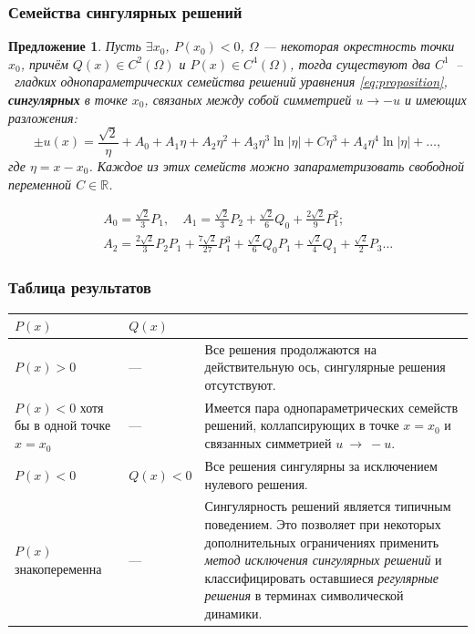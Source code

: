 \documentclass [10pt] {beamer}
\newtheorem{proposition}{Предложение}
\begin{document}
\begin{frame}
	\frametitle{Семейства сингулярных решений}

	\begin{proposition}
		Пусть $\exists x_0$, $P(x_0) < 0$, $\Omega$ --- некоторая окрестность точки $x_0$, причём $Q(x) \in C^2(\Omega)$ и $P(x) \in C^4(\Omega)$, тогда существуют два $C^1$~--~гладких однопараметрических семейства решений уравнения \eqref{eq:proposition}, {\bf сингулярных} в точке $x_0$, связаных между собой симметрией $u \to -u$ и имеющих разложения:
		\begin{equation}
			\pm u(x) = \frac{\sqrt{2}} \eta + A_0 + A_1 \eta + A_2 \eta^2 + A_3 \eta^3 \ln|\eta| + C \eta^3 + A_4 	\eta^4 \ln|\eta| + \ldots,
			\label{eq:series}
		\end{equation}
 		где $\eta = x - x_0$.
		Каждое из этих семейств можно запараметризовать свободной переменной $C \in \mathbb{R}$.
	\end{proposition}

	\begin{small}
		\begin{eqnarray*}	
			&& A_0 = \frac{\sqrt{2}}3P_1, \quad A_1 = \frac{\sqrt{2}} 3P_2 + \frac{\sqrt{2}} 6Q_0 + \frac{2\sqrt{2}} 9P_1^2; \\[2mm]
			&& A_2 = \frac{2\sqrt{2}} 3P_2 P_1 + \frac{7\sqrt{2}}{27} P_1^3 + \frac{\sqrt{2}} 6Q_0 P_1 + \frac{\sqrt{2}} 4Q_1 + \frac{\sqrt{2}} 2P_3 \dots
		\end{eqnarray*}
	\end{small}	
\end{frame}

\begin{frame}
	\frametitle{Таблица результатов}
	
	\begin{table}
		\begin{tabular}{ | m{70pt} | l || m{190pt} | }
			\hline
			$P(x)$ & $Q(x)$ & \\
			\hline
			$P(x) > 0$ & --- & Все решения продолжаются на действительную ось, сингулярные решения отсутствуют. \\
			\hline
			$P(x) < 0$ хотя бы в одной точке $x = x_0$ & --- & Имеется пара однопараметрических семейств решений, коллапсирующих в точке $x = x_0$ и связанных симметрией $u~\to~-u$. \\
			\hline
			$P(x) < 0$ & $Q(x) < 0$ & Все решения сингулярны за исключением нулевого решения. \\
			\hline
			$P(x)$ знакопеременна & --- & {\color{ceruleanblue} Сингулярность решений является типичным поведением}. Это позволяет при некоторых дополнительных ограничениях применить {\it метод исключения сингулярных решений} и {\color{ceruleanblue} классифицировать} оставшиеся {\it регулярные решения} в терминах символической динамики. \\
			\hline
		\end{tabular}
	\end{table}

\end{frame}
\end{document}
